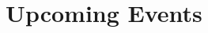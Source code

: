 \documentclass{article}
\begin{document}
\section{\faCalendar\ Upcoming Events}





% 




% 





\end{document}
